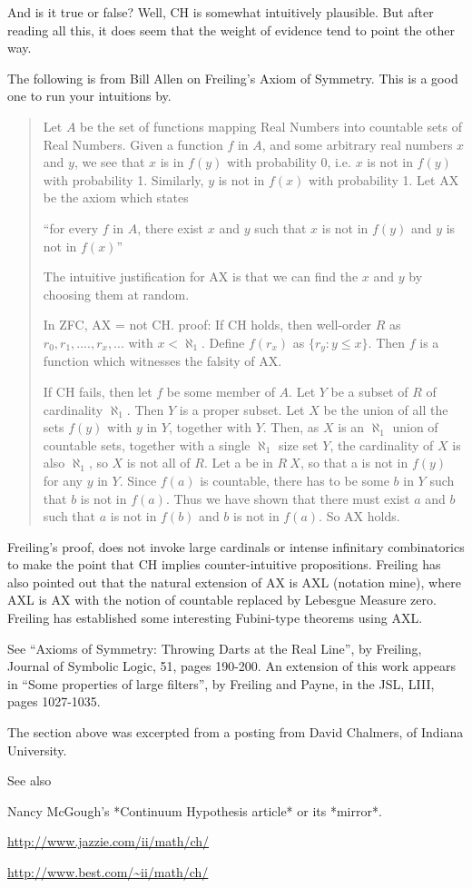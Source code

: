  And is it true or false?  Well, CH is somewhat intuitively
plausible.  But after reading all this, it does seem that the weight of
evidence tend to point the other way.

The following is from Bill Allen on Freiling's Axiom of Symmetry.
This is a good one to run your intuitions by.
\begin{quote}
Let $A$ be the set of functions mapping Real Numbers into countable sets
of Real Numbers.  Given a function $f$ in $A$, and some arbitrary real
numbers $x$ and $y$, we see that $x$ is in $f(y)$ with probability 0, i.e. $x$
 is
not in $f(y)$ with probability 1.  Similarly, $y$ is not in $f(x)$ with
probability 1.  Let AX be the axiom which states

     ``for every $f$ in $A$, there exist $x$ and $y$ such that $x$ is not in 
$f(y)$
      and $y$ is not in $f(x)$''

The intuitive justification for AX is that we can find the $x$ and $y$ by
choosing them at random.

In ZFC, AX = not CH.
proof:
If CH holds, then well-order $R$ as $r_0, r_1, .... , r_x, ...$
with $x < \aleph_1$.  Define $f(r_x)$ as $\{r_y : y \leq x\}$.  Then $f$ is a
function which witnesses the falsity of AX.

If CH fails, then let $f$ be some member of $A$.  Let $Y$ be a subset of $R$ of
cardinality $\aleph_1$.  Then $Y$ is a proper subset.  Let $X$ be the union of
all the sets $f(y)$ with $y$ in $Y$, together with $Y$.  Then, as $X$ is an
$\aleph_1$ union of countable sets, together with a single $\aleph_1$ size set
$Y$, the cardinality of $X$ is also $\aleph_1$, so $X$ is not all of $R$. 
 Let a be
in $R \ X$, so that a is not in $f(y)$ for any $y$ in $Y$.  Since $f(a)$ is
countable, there has to be some $b$ in $Y$ such that $b$ is not in $f(a)$. 
 Thus
we have shown that there must exist $a$ and $b$ such that $a$ is not in $f(b)$
and $b$ is not in $f(a)$.  So AX holds. 
\end{quote}
Freiling's proof, does not invoke large cardinals or
intense infinitary combinatorics to make the point that CH implies
counter-intuitive propositions.  Freiling has also pointed out that the
natural extension of AX is AXL (notation mine), where AXL is AX with
the notion of countable replaced by Lebesgue Measure zero.  Freiling has
established some interesting Fubini-type theorems using AXL.

See ``Axioms of Symmetry: Throwing Darts at the Real Line'', by Freiling,
Journal of Symbolic Logic, 51, pages 190-200.  An extension of this work
appears in ``Some properties of large filters'', by Freiling and Payne, in
the JSL, LIII, pages 1027-1035.

The section above was excerpted from a posting from David Chalmers,
of Indiana University.


See also

   Nancy McGough's *Continuum Hypothesis article* or its *mirror*.


\url{http://www.jazzie.com/ii/math/ch/}

\url{http://www.best.com/~ii/math/ch/}
